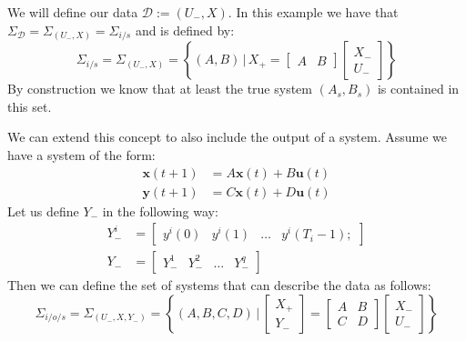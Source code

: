 We will define our data $\mathcal{D} := (U_-, X)$. In this example we have that $\Sigma_\mathcal{D} = \Sigma_{(U_-,X)} = \Sigma_{i/s}$ and is defined by:
\[ \Sigma_{i/s} = \Sigma_{(U_-,X)} = \left\{ (A, B) \, | \, X_{+} = \begin{bmatrix} A & B \end{bmatrix} \begin{bmatrix} X_{-} \\ U_{-} \end{bmatrix} \right\} \]
By construction we know that at least the true system $(A_s,B_s)$ is contained in this set.

We can extend this concept to also include the output of a system. Assume we have a system of the form:
\begin{align}
	\label{isoSystem}
	\mathbf{x}(t+1) &= A \mathbf{x}(t) + B \mathbf{u}(t) \\
	\mathbf{y}(t+1) &= C \mathbf{x}(t) + D \mathbf{u}(t)
\end{align}
Let us define $Y_-$ in the following way:
\begin{align*}
	Y_-^i &= \begin{bmatrix}	y^i(0) & y^i(1)& \dots & y^i(T_i-1); \end{bmatrix}\\
	Y_- &= \begin{bmatrix} Y_-^1 & Y_-^2 & \dots & Y_-^q	\end{bmatrix}
\end{align*}
Then we can define the set of systems that can describe the data as follows:
\begin{equation}
\label{isoSet} 
\Sigma_{i/o/s} = 
\Sigma_{(U_-,X, Y_-)} = \left\{ (A, B, C, D) \, | \, 
\begin{bmatrix} X_{+} \\ Y_{-} \end{bmatrix} = 
\begin{bmatrix} A & B \\ C & D \end{bmatrix} 
\begin{bmatrix} X_{-} \\ U_{-} \end{bmatrix} \right\} 
\end{equation}

